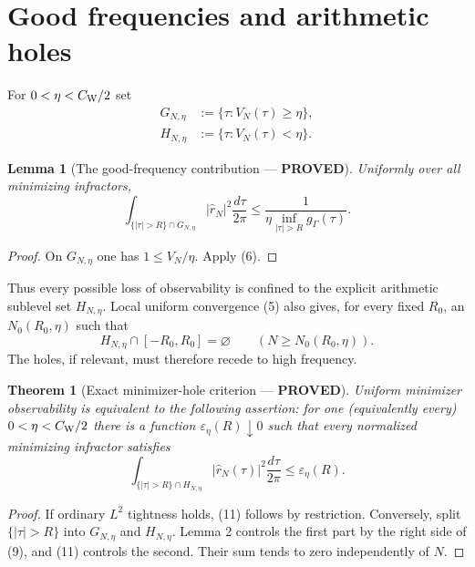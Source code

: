 \documentclass[11pt]{article}
\newcommand{\PROVED}{\textcolor{green!40!black}{\textbf{PROVED}}}
\newtheorem{theorem}{Theorem}
\newtheorem{lemma}{Lemma}
\begin{document}
\section{Good frequencies and arithmetic holes}

For $0<\eta<C_{\rm W}/2$ set
\begin{align}
 G_{N,\eta}&:=\{\tau:V_N(\tau)\ge\eta\},                         \tag{7}\\
 H_{N,\eta}&:=\{\tau:V_N(\tau)<\eta\}.                          \tag{8}
\end{align}

\begin{lemma}[The good-frequency contribution --- \PROVED]
Uniformly over all minimizing infractors,
\begin{equation}
 \int_{\{|\tau|>R\}\cap G_{N,\eta}}|\widehat r_N|^2
       \frac{d\tau}{2\pi}
 \le
 \frac1{\eta\inf_{|\tau|>R}g_\Gamma(\tau)}.                   \tag{9}
\end{equation}
\end{lemma}

\begin{proof}
On $G_{N,\eta}$ one has $1\le V_N/\eta$.  Apply (6).
\end{proof}

Thus every possible loss of observability is confined to the explicit
arithmetic sublevel set $H_{N,\eta}$.  Local uniform convergence (5)
also gives, for every fixed $R_0$, an $N_0(R_0,\eta)$ such that
\begin{equation}
 H_{N,\eta}\cap[-R_0,R_0]=\varnothing
 \qquad(N\ge N_0(R_0,\eta)).                              \tag{10}
\end{equation}
The holes, if relevant, must therefore recede to high frequency.

\begin{theorem}[Exact minimizer-hole criterion --- \PROVED]
Uniform minimizer observability is equivalent to the following assertion:
for one (equivalently every) $0<\eta<C_{\rm W}/2$ there is a function
$\varepsilon_\eta(R)\downarrow0$ such that every normalized minimizing
infractor satisfies
\begin{equation}
 \boxed{
 \int_{\{|\tau|>R\}\cap H_{N,\eta}}|\widehat r_N(\tau)|^2
       \frac{d\tau}{2\pi}
 \le\varepsilon_\eta(R).}                               \tag{11}
\end{equation}
\end{theorem}

\begin{proof}
If ordinary $L^2$ tightness holds, (11) follows by restriction.  Conversely,
split $\{|\tau|>R\}$ into $G_{N,\eta}$ and $H_{N,\eta}$.  Lemma 2 controls
the first part by the right side of (9), and (11) controls the second.
Their sum tends to zero independently of $N$.
\end{proof}
\end{document}
